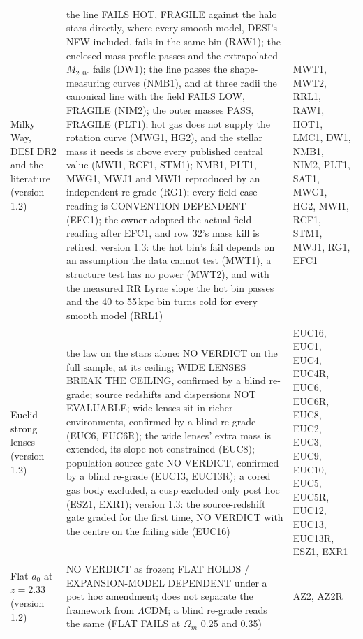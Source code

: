 \documentclass[10pt]{article}
\begin{document}
{\begin{longtable}{@{}p{4.0cm}p{9.4cm}p{2.5cm}@{}}
Milky Way, DESI DR2 and the literature (version 1.2) & the line FAILS HOT, FRAGILE against the halo stars directly, where every smooth model, DESI's NFW included, fails in the same bin (RAW1); the enclosed-mass profile passes and the extrapolated $M_{200c}$ fails (DW1); the line passes the shape-measuring curves (NMB1), and at three radii the canonical line with the field FAILS LOW, FRAGILE (NIM2); the outer masses PASS, FRAGILE (PLT1); hot gas does not supply the rotation curve (MWG1, HG2), and the stellar mass it needs is above every published central value (MWI1, RCF1, STM1); NMB1, PLT1, MWG1, MWJ1 and MWI1 reproduced by an independent re-grade (RG1); every field-case reading is CONVENTION-DEPENDENT (EFC1); the owner adopted the actual-field reading after EFC1, and row 32's mass kill is retired; version 1.3: the hot bin's fail depends on an assumption the data cannot test (MWT1), a structure test has no power (MWT2), and with the measured RR Lyrae slope the hot bin passes and the 40 to 55\,kpc bin turns cold for every smooth model (RRL1) & MWT1, MWT2, RRL1, RAW1, HOT1, LMC1, DW1, NMB1, NIM2, PLT1, SAT1, MWG1, HG2, MWI1, RCF1, STM1, MWJ1, RG1, EFC1\\
Euclid strong lenses (version 1.2) & the law on the stars alone: NO VERDICT on the full sample, at its ceiling; WIDE LENSES BREAK THE CEILING, confirmed by a blind re-grade; source redshifts and dispersions NOT EVALUABLE; wide lenses sit in richer environments, confirmed by a blind re-grade (EUC6, EUC6R); the wide lenses' extra mass is extended, its slope not constrained (EUC8); population source gate NO VERDICT, confirmed by a blind re-grade (EUC13, EUC13R); a cored gas body excluded, a cusp excluded only post hoc (ESZ1, EXR1); version 1.3: the source-redshift gate graded for the first time, NO VERDICT with the centre on the failing side (EUC16) & EUC16, EUC1, EUC4, EUC4R, EUC6, EUC6R, EUC8, EUC2, EUC3, EUC9, EUC10, EUC5, EUC5R, EUC12, EUC13, EUC13R, ESZ1, EXR1\\
Flat $a_0$ at $z=2.33$ (version 1.2) & NO VERDICT as frozen; FLAT HOLDS / EXPANSION-MODEL DEPENDENT under a post hoc amendment; does not separate the framework from $\Lambda$CDM; a blind re-grade reads the same (FLAT FAILS at $\Omega_m$ 0.25 and 0.35) & AZ2, AZ2R\\\bottomrule
\end{longtable}}
\end{document}
